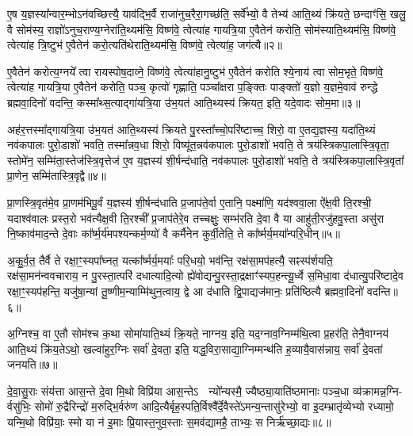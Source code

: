 ए॒ष य॒ज्ञस्या᳚न्वार॒म्भो\-ऽन॑वच्छित्त्यै॒ याव॑द्भि॒र्वै राजा॑नुच॒रैरा॒गच्छ॑ति॒ सर्वे᳚भ्यो॒ वै तेभ्य॑ आति॒थ्यं क्रि॑यते॒ छन्दाꣳ॑सि॒ खलु॒ वै सोम॑स्य॒ राज्ञो॑\-ऽनुच॒राण्य॒ग्नेरा॑ति॒थ्यम॑सि॒ विष्ण॑वे॒ त्वेत्या॑ह गायत्रि॒या ए॒वैतेन॑ करोति॒ सोम॑स्याति॒थ्यम॑सि॒ विष्ण॑वे॒ त्वेत्या॑ह त्रि॒ष्टुभ॑ ए॒वैतेन॑ करो॒त्यति॑थेराति॒थ्यम॑सि॒ विष्ण॑वे॒ त्वेत्या॑ह॒ जग॑त्यै॥२॥

ए॒वैतेन॑ करोत्य॒ग्नये᳚ त्वा रायस्पोष॒दाव्ने॒ विष्ण॑वे॒ त्वेत्या॑हानु॒ष्टुभ॑ ए॒वैतेन॑ करोति श्ये॒नाय॑ त्वा सोम॒भृते॒ विष्ण॑वे॒ त्वेत्या॑ह गायत्रि॒या ए॒वैतेन॑ करोति॒ पञ्च॒ कृत्वो॑ गृह्णाति॒ पञ्चा᳚क्षरा प॒ङ्क्तिः पाङ्क्तो॑ य॒ज्ञो य॒ज्ञमे॒वाव॑ रुन्द्धे ब्रह्मवा॒दिनो॑ वदन्ति॒ कस्मा᳚थ्स॒त्याद्गा॑यत्रि॒या उ॑भ॒यत॑ आति॒थ्यस्य॑ क्रियत॒ इति॒ यदे॒वादः सोम॒मा॥३॥

अह॑र॒त्तस्मा᳚द्गायत्रि॒या उ॑भ॒यत॑ आति॒थ्यस्य॑ क्रियते पु॒रस्ता᳚च्चो॒परि॑ष्टाच्च॒ शिरो॒ वा ए॒तद्य॒ज्ञस्य॒ यदा॑ति॒थ्यं नव॑कपालः पुरो॒डाशो॑ भवति॒ तस्मा᳚न्नव॒धा शिरो॒ विष्यू॑त॒न्नव॑कपालः पुरो॒डाशो॑ भवति॒ ते त्रय॑स्त्रिकपा॒लास्त्रि॒वृता॒ स्तोमे॑न॒ सम्मि॑ता॒स्तेज॑स्त्रि॒वृत्तेज॑ ए॒व य॒ज्ञस्य॑ शी॒र्\mbox{}षन्द॑धाति॒ नव॑कपालः पुरो॒डाशो॑ भवति॒ ते त्रय॑स्त्रिकपा॒लास्त्रि॒वृता᳚ प्रा॒णेन॒ सम्मि॑तास्त्रि॒वृद्वै॥४॥

प्रा॒णस्त्रि॒वृत॑मे॒व प्रा॒णम॑भिपू॒र्वं य॒ज्ञस्य॑ शी॒र्\mbox{}षन्द॑धाति प्र॒जाप॑ते॒र्वा ए॒तानि॒ पक्ष्मा॑णि॒ यद॑श्ववा॒ला ऐ᳚क्ष॒वी ति॒रश्ची॒ यदाश्व॑वालः प्रस्त॒रो भव॑त्यैक्ष॒वी ति॒रश्ची᳚ प्र॒जाप॑तेरे॒व तच्चक्षुः॒ सम्भ॑रति दे॒वा वै या आहु॑ती॒रजु॑हवु॒स्ता असु॑रा नि॒ष्काव॑माद॒न्ते दे॒वाः का᳚र्\mbox{}ष्म॒र्य॑मपश्यन्कर्म॒ण्यो॑ वै कर्मै॑नेन कुर्वी॒तेति॒ ते का᳚र्ष्मर्य॒मया᳚न्परि॒धीन्॥५॥

अ॒कु॒र्व॒त॒ तैर्वै ते रक्षा॒ꣳ॒स्यपा᳚घ्नत॒ यत्का᳚र्ष्मर्य॒मयाः᳚ परि॒धयो॒ भव॑न्ति॒ रक्ष॑सा॒मप॑हत्यै॒ सꣴस्प॑र्शयति॒ रक्ष॑सा॒मन॑न्ववचाराय॒ न पु॒रस्ता॒त्परि॑ दधात्यादि॒त्यो ह्ये॑वोद्यन्पु॒रस्ता॒द्रक्षाꣳ॑स्यप॒हन्त्यू॒र्ध्वे स॒मिधा॒वा द॑धात्यु॒परि॑ष्टादे॒व रक्षा॒ꣳ॒स्यप॑हन्ति॒ यजु॑षा॒न्यां तू॒ष्णीम॒न्याम्मि॑थुन॒त्वाय॒ द्वे आ द॑धाति द्वि॒पाद्यज॑मानः॒ प्रति॑ष्ठित्यै ब्रह्मवा॒दिनो॑ वदन्ति॥६॥

अ॒ग्निश्च॒ वा ए॒तौ सोम॑श्च क॒था सोमा॑याति॒थ्यं क्रि॒यते॒ नाग्नय॒ इति॒ यद॒ग्नाव॒ग्निम्म॑थि॒त्वा प्र॒हर॑ति॒ तेनै॒वाग्नय॑ आति॒थ्यं क्रि॑य॒ते\-ऽथो॒ खल्वा॑हुर॒ग्निः सर्वा॑ दे॒वता॒ इति॒ यद्ध॒विरा॒साद्या॒ग्निम्मन्थ॑ति ह॒व्यायै॒वास॑न्नाय॒ सर्वा॑ दे॒वता॑ जनयति॥७॥

{\anuvakamend[{पत्नि॑या ए॒व जग॑त्या॒ आ त्रि॒वृद्वै प॑रि॒धीन् व॑द॒न्त्येक॑चत्वारिꣳशच्च॥१॥}]}

दे॒वा॒सु॒राः संय॑त्ता आस॒न्ते दे॒वा मि॒थो विप्रि॑या आस॒न्ते\-ऽ  न्यो᳚न्यस्मै॒ ज्यैष्ठ्या॒याति॑ष्ठमानाः पञ्च॒धा व्य॑क्रामन्न॒ग्नि- र्वसु॑भिः॒ सोमो॑ रु॒द्रैरिन्द्रो॑ म॒रुद्भि॒र्वरु॑ण आदि॒त्यैर्बृह॒स्पति॒र्विश्वै᳚र्दे॒वैस्ते॑\-ऽमन्य॒न्तासु॑रेभ्यो॒ वा इ॒दम्भ्रातृ॑व्येभ्यो रध्यामो॒ यन्मि॒थो विप्रि॑याः॒ स्मो या न॑ इ॒माः प्रि॒यास्त॒नुव॒स्ताः स॒मव॑द्यामहै॒ ताभ्यः॒ स निर्\mbox{}ऋ॑च्छा॒द्यः॥८॥

